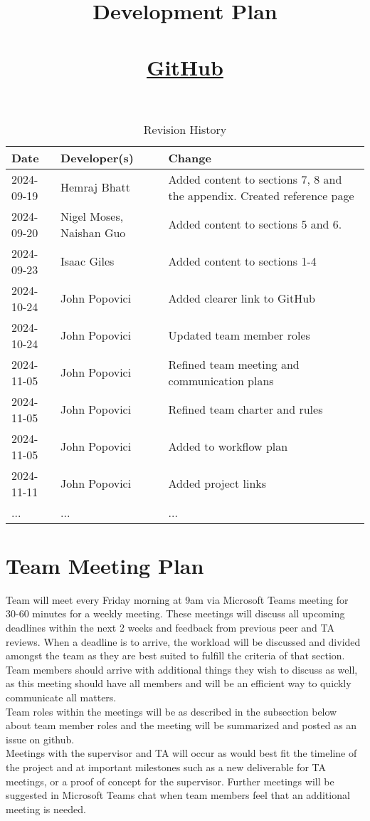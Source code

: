 \documentclass{article}
\title{Development Plan\\\progname\\\href{https://github.com/John-Popovici/duel-of-the-eights.git}{GitHub}}
\author{\authname}
\date{}
\begin{document}
\maketitle

\begin{table}[hp]
\caption{Revision History} \label{TblRevisionHistory}
\begin{tabularx}{\textwidth}{llX}
\toprule
\textbf{Date} & \textbf{Developer(s)} & \textbf{Change}\\
\midrule
2024-09-19 & Hemraj Bhatt & Added content to sections 7, 8 and the appendix. Created reference page\\
2024-09-20 & Nigel Moses, Naishan Guo & Added content to sections 5 and 6.\\
2024-09-23 & Isaac Giles & Added content to sections 1-4\\
2024-10-24 & John Popovici & Added clearer link to GitHub\\
2024-10-24 & John Popovici & Updated team member roles\\
2024-11-05 & John Popovici & Refined team meeting and communication plans\\
2024-11-05 & John Popovici & Refined team charter and rules\\
2024-11-05 & John Popovici & Added to workflow plan\\
2024-11-11 & John Popovici & Added project links\\
... & ... & ...\\
\bottomrule
\end{tabularx}
\end{table}

\newpage
\section{Team Meeting Plan}

Team will meet every Friday morning at 9am via Microsoft Teams meeting for 30-60 minutes for a weekly meeting. These meetings will discuss all upcoming deadlines within the next 2 weeks and feedback from previous peer and TA reviews. When a deadline is to arrive, the workload will be discussed and divided amongst the team as they are best suited to fulfill the criteria of that section.
Team members should arrive with additional things they wish to discuss as well, as this meeting should have all members and will be an efficient way to quickly communicate all matters.\\
Team roles within the meetings will be as described in the subsection below about team member roles and the meeting will be summarized and posted as an issue on github.\\
Meetings with the supervisor and TA will occur as would best fit the timeline of the project and at important milestones such as a new deliverable for TA meetings, or a proof of concept for the supervisor.
Further meetings will be suggested in Microsoft Teams chat when team members feel that an additional meeting is needed.
\end{document}
